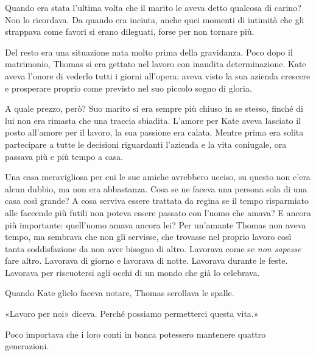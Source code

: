 \documentclass[a4paper,oneside,11pt]{memoir}
\begin{document}
Quando era stata l'ultima volta che il marito le aveva detto qualcosa di carino?
Non lo ricordava. Da quando era incinta, anche quei momenti di intimità che gli
strappava come favori si erano dileguati, forse per non tornare più.

Del resto era una situazione nata molto prima della gravidanza. Poco dopo il
matrimonio, Thomas si era gettato nel lavoro con inaudita determinazione. Kate
aveva l'onore di vederlo tutti i giorni all'opera; aveva visto la sua azienda
crescere e prosperare proprio come previsto nel suo piccolo sogno di gloria.

A quale prezzo, però? Suo marito si era sempre più chiuso in se stesso, finché
di lui non era rimasta che una traccia sbiadita. L'amore per Kate aveva lasciato
il posto all'amore per il lavoro, la sua passione era calata. Mentre prima era
solita partecipare a tutte le decisioni riguardanti l'azienda e la vita
coniugale, ora passava più e più tempo a casa.

Una casa meravigliosa per cui le sue amiche avrebbero ucciso, su questo non
c'era alcun dubbio, ma non era abbastanza. Cosa se ne faceva una persona sola di
una casa così grande? A cosa serviva essere trattata da regina se il tempo
risparmiato alle faccende più futili non poteva essere passato con l'uomo che
amava? E ancora più importante: quell'uomo amava ancora lei? Per un'amante
Thomas non aveva tempo, ma sembrava che non gli servisse, che trovasse nel
proprio lavoro così tanta soddisfazione da non aver bisogno di altro. Lavorava
come se \emph{non sapesse} fare altro. Lavorava di giorno e lavorava di notte.
Lavorava durante le feste. Lavorava per riscuotersi agli occhi di un mondo che
già lo celebrava.

Quando Kate glielo faceva notare, Thomas scrollava le spalle.

«Lavoro per noi» diceva. Perché possiamo permetterci questa vita.»

Poco importava che i loro conti in banca potessero mantenere quattro
generazioni.
\end{document}
